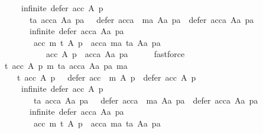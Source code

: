 \begin{isabellebody}
\ \ \ \ \ \ \ \ infinite\ {\isacharparenleft}{\kern0pt}defer\ acc\ A\ p{\isacharparenright}{\kern0pt}\ {\isasymLongrightarrow}\isanewline
\ \ \ \ \ \ \ \ \ \ ta\ {\isacharparenleft}{\kern0pt}acca\ Aa\ pa{\isacharparenright}{\kern0pt}\ {\isasymor}\ {\isasymnot}\ defer\ {\isacharparenleft}{\kern0pt}acca\ {\isasymtriangleright}\ ma{\isacharparenright}{\kern0pt}\ Aa\ pa\ {\isasymsubset}\ defer\ acca\ Aa\ pa\ {\isasymor}\isanewline
\ \ \ \ \ \ \ \ \ \ infinite\ {\isacharparenleft}{\kern0pt}defer\ acca\ Aa\ pa{\isacharparenright}{\kern0pt}\ {\isasymLongrightarrow}\isanewline
\ \ \ \ \ \ \ \ \ \ \ {\isacharparenleft}{\kern0pt}acc{\isacharcomma}{\kern0pt}\ m{\isacharcomma}{\kern0pt}\ t{\isacharcomma}{\kern0pt}\ A{\isacharcomma}{\kern0pt}\ p{\isacharparenright}{\kern0pt}\ {\isacharequal}{\kern0pt}\ {\isacharparenleft}{\kern0pt}acca{\isacharcomma}{\kern0pt}\ ma{\isacharcomma}{\kern0pt}\ ta{\isacharcomma}{\kern0pt}\ Aa{\isacharcomma}{\kern0pt}\ pa{\isacharparenright}{\kern0pt}\ {\isasymLongrightarrow}\isanewline
\ \ \ \ \ \ \ \ \ \ \ \ \ \ acc\ A\ p\ {\isacharequal}{\kern0pt}\ acca\ Aa\ pa{\isachardoublequoteclose}\isanewline
\ \ \ \ \isamarkupfalse%
\ fastforce\isanewline
{}\isamarkupfalse%
\isanewline
\ \ \isamarkupfalse%
\isanewline
\ \ \ \ {\isachardoublequoteopen}{\isasymAnd}t\ acc\ A\ p\ m\ ta\ acca\ Aa\ pa\ ma{\isachardot}{\kern0pt}\isanewline
\ \ \ \ \ \ \ t\ {\isacharparenleft}{\kern0pt}acc\ A\ p{\isacharparenright}{\kern0pt}\ {\isasymor}\ {\isasymnot}\ defer\ {\isacharparenleft}{\kern0pt}acc\ {\isasymtriangleright}\ m{\isacharparenright}{\kern0pt}\ A\ p\ {\isasymsubset}\ defer\ acc\ A\ p\ {\isasymor}\isanewline
\ \ \ \ \ \ \ \ infinite\ {\isacharparenleft}{\kern0pt}defer\ acc\ A\ p{\isacharparenright}{\kern0pt}\ {\isasymLongrightarrow}\isanewline
\ \ \ \ \ \ \ \ \ \ {\isasymnot}\ {\isacharparenleft}{\kern0pt}ta\ {\isacharparenleft}{\kern0pt}acca\ Aa\ pa{\isacharparenright}{\kern0pt}\ {\isasymor}\ {\isasymnot}\ defer\ {\isacharparenleft}{\kern0pt}acca\ {\isasymtriangleright}\ ma{\isacharparenright}{\kern0pt}\ Aa\ pa\ {\isasymsubset}\ defer\ acca\ Aa\ pa\ {\isasymor}\isanewline
\ \ \ \ \ \ \ \ \ \ infinite\ {\isacharparenleft}{\kern0pt}defer\ acca\ Aa\ pa{\isacharparenright}{\kern0pt}{\isacharparenright}{\kern0pt}\ {\isasymLongrightarrow}\isanewline
\ \ \ \ \ \ \ \ \ \ \ {\isacharparenleft}{\kern0pt}acc{\isacharcomma}{\kern0pt}\ m{\isacharcomma}{\kern0pt}\ t{\isacharcomma}{\kern0pt}\ A{\isacharcomma}{\kern0pt}\ p{\isacharparenright}{\kern0pt}\ {\isacharequal}{\kern0pt}\ {\isacharparenleft}{\kern0pt}acca{\isacharcomma}{\kern0pt}\ ma{\isacharcomma}{\kern0pt}\ ta{\isacharcomma}{\kern0pt}\ Aa{\isacharcomma}{\kern0pt}\ pa{\isacharparenright}{\kern0pt}\ {\isasymLongrightarrow}\isanewline

\end{isabellebody}
